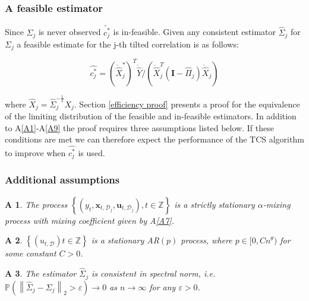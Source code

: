 \documentclass[11pt]{report}\usepackage[utf8]{inputenc}
\newtheorem{assump}{A}
\begin{document}
\subsubsection{A feasible estimator}

Since $\Sigma_j$ is never observed $\widetilde{c_j^*}$ is in-feasible. Given any consistent estimator $\widehat{\Sigma}_j$ for $\Sigma_j$ a feasible estimate for the j-th tilted correlation is as follows: 

\begin{equation*}
    \widehat{c_j^*}= \left ( \mathring{\widehat{X}}_j^* \right )^T \mathring{\widehat{Y}} / \left ( \mathring{\widehat{X}}_j^T \left ( \mathbf{I} - \widehat{\Pi}_j \right ) \mathring{\widehat{X}}_j \right )
\end{equation*}

where $\widehat{X}_j = \widehat{\Sigma}_j^{-\frac{1}{2}} X_j$. Section \ref{efficiency proof} presents a proof for the equivalence of the limiting distribution of the feasible and in-feasible estimators. In addition to A\ref{A1}-A\ref{A9} the proof requires three assumptions listed below. If these conditions are met we can therefore expect the performance of the TCS algorithm to improve when $\widehat{c_j^*}$ is used. 

\subsubsection{Additional assumptions}

\begin{assump} \label{A10}
    The process $\left \{ \left ( y_t, \boldsymbol{x}_{t,\mathcal{D}_j}, \boldsymbol{u}_{t,\mathcal{D}_j} \right ), t \in \mathbb{Z} \right \}$ is a strictly stationary $\alpha$-mixing process with mixing coefficient given by A\ref{A7}. 
\end{assump}

\begin{assump} \label{A11}
    $\left \{ \left (u_{t,\mathcal{D}}  \right ) t \in \mathbb{Z} \right \}$ is a stationary AR$(p)$ process, where $p \in [0, Cn^{\theta})$ for some constant $C>0$.
\end{assump}

\begin{assump} \label{A12}
    The estimator $\widehat{\Sigma}_j$ is consistent in spectral norm, i.e. $ \mathbb{P} \left ( \left \| \widehat{\Sigma}_j - \Sigma_j \right \|_2 > \varepsilon \right ) \rightarrow 0$ as $n \rightarrow \infty$ for any $\varepsilon > 0$.
\end{assump}
\end{document}
